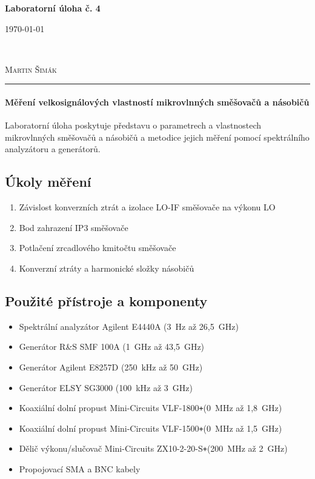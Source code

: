 \documentclass[11pt,a4paper]{article}
\newcommand{\plus}{{\texttt{+}}}
\begin{document}

\begin{center}
    {\LARGE\textbf{Laboratorní úloha č. 4}}\\[3mm]
    \begin{minipage}{0.4\textwidth}
        \begin{flushleft}
            \textsc{\today}
        \end{flushleft}
    \end{minipage}
    ~
    \begin{minipage}{0.4\textwidth}
        \begin{flushright}
            \textsc{Martin Šimák}
        \end{flushright}
    \end{minipage}
    \noindent\rule{14.5cm}{0.4pt}
\end{center}

\paragraph*{Měření velkosignálových vlastností mikrovlnných směšovačů a násobičů} Laboratorní úloha poskytuje představu o parametrech a vlastnostech mikrovlnných směšovačů a násobičů a metodice jejich měření pomocí spektrálního analyzátoru a generátorů.

\subsection*{Úkoly měření}
\begin{enumerate}
    \item Závislost konverzních ztrát a izolace LO-IF směšovače na výkonu LO
    \item Bod zahrazení IP3 směšovače
    \item Potlačení zrcadlového kmitočtu směšovače
    \item Konverzní ztráty a harmonické složky násobičů
\end{enumerate}

\subsection*{Použité přístroje a komponenty}
\begin{itemize}
    \item Spektrální analyzátor Agilent E4440A (3~Hz až 26,5~GHz)
    \item Generátor R\&S SMF 100A (1~GHz až 43,5~GHz)
    \item Generátor Agilent E8257D (250~kHz až 50~GHz)
    \item Generátor ELSY SG3000 (100~kHz až 3~GHz)
    \item Koaxiální dolní propust Mini-Circuits VLF-1800\plus (0~MHz až 1,8~GHz)
    \item Koaxiální dolní propust Mini-Circuits VLF-1500\plus (0~MHz až 1,5~GHz)
    \item Dělič výkonu/slučovač Mini-Circuits ZX10-2-20-S\plus (200~MHz až 2~GHz)
    \item Propojovací SMA a BNC kabely
\end{itemize}
\end{document}
